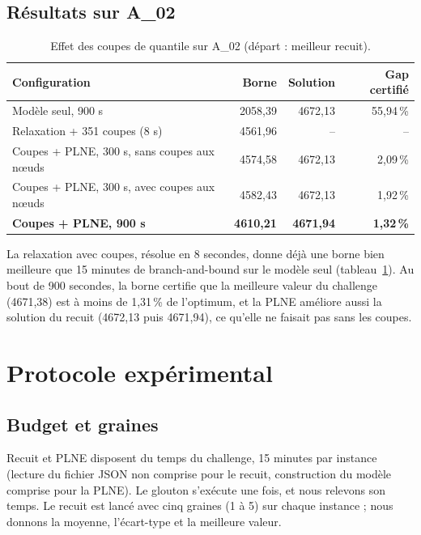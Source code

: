 \documentclass[11pt,a4paper]{report}
\begin{document}
\section{Résultats sur A\_02}

\begin{table}[H]
\centering
\small
\caption{Effet des coupes de quantile sur A\_02 (départ : meilleur recuit).}
\label{tab:coupes}
\begin{tabular}{lrrr}
\toprule
Configuration & Borne & Solution & Gap certifié \\
\midrule
Modèle seul, 900 s & 2058,39 & 4672,13 & 55,94\,\% \\
Relaxation + 351 coupes (8 s) & 4561,96 & -- & -- \\
Coupes + PLNE, 300 s, sans coupes aux nœuds & 4574,58 & 4672,13 & 2,09\,\% \\
Coupes + PLNE, 300 s, avec coupes aux nœuds & 4582,43 & 4672,13 & 1,92\,\% \\
\textbf{Coupes + PLNE, 900 s} & \textbf{4610,21} & \textbf{4671,94} & \textbf{1,32\,\%} \\
\bottomrule
\end{tabular}
\end{table}

La relaxation avec coupes, résolue en 8 secondes, donne déjà une borne bien meilleure que 15 minutes
de branch-and-bound sur le modèle seul (tableau~\ref{tab:coupes}). Au bout de 900 secondes, la borne
certifie que la meilleure valeur du challenge (4671,38) est à moins de 1,31\,\% de l'optimum, et la
PLNE améliore aussi la solution du recuit (4672,13 puis 4671,94), ce qu'elle ne faisait pas sans les
coupes.

\chapter{Protocole expérimental}\label{chap:protocole}

\section{Budget et graines}

Recuit et PLNE disposent du temps du challenge, 15 minutes par instance (lecture du fichier JSON non
comprise pour le recuit, construction du modèle comprise pour la PLNE). Le glouton s'exécute une
fois, et nous relevons son temps. Le recuit est lancé avec cinq graines (1 à 5) sur chaque instance ;
nous donnons la moyenne, l'écart-type et la meilleure valeur.
\end{document}
